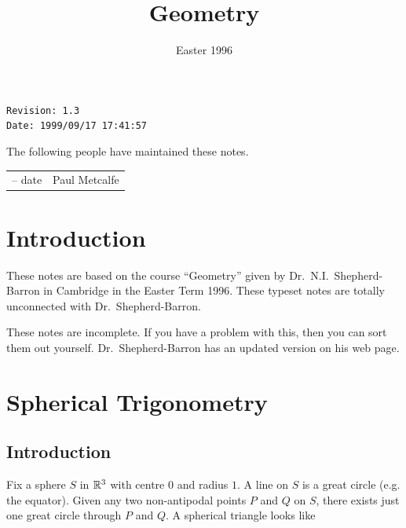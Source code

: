 \documentclass{notes}
\theoremstyle{plain}
\begin{document}
\frontmatter
\title{Geometry}

\date{Easter 1996}

\maketitle

\thispagestyle{empty}
\noindent\verb$Revision: 1.3 $\hfill\\
\noindent\verb$Date: 1999/09/17 17:41:57 $\hfill\
\vspace{1.5in}

The following people have maintained these notes.

\begin{center}
\begin{tabular}{ r  l}
-- date & Paul Metcalfe
\end{tabular}
\end{center}

\tableofcontents

\chapter{Introduction}

These notes are based on the course ``Geometry'' given by
Dr.~N.I.~Shepherd-Barron in Cambridge in the Easter Term 1996.  These
typeset notes are totally unconnected with Dr.~Shepherd-Barron.

These notes are incomplete.  If you have a problem with this, then you
can sort them out yourself.  Dr.~Shepherd-Barron has an updated
version on his web page.

\alsoavailable
\archimcopyright

\mainmatter

\chapter{Spherical Trigonometry}

\section{Introduction}

Fix a sphere $S$ in $\mathbb{R}^3$ with centre $0$ and radius $1$.  A line on $S$ is
a great circle (e.g. the equator).  Given any two non-antipodal points $P$
and $Q$ on $S$, there exists just one great circle through $P$ and $Q$.  A
spherical triangle looks like
\end{document}
